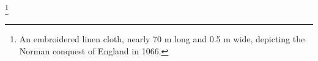 \footnote{An embroidered linen cloth, nearly 70 m long and 0.5 m wide, depicting the Norman conquest of England in 1066.}